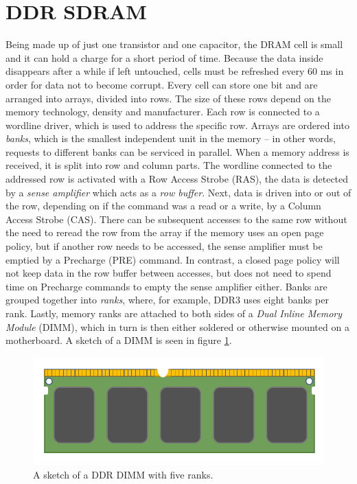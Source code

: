 \section{DDR SDRAM}
Being made up of just one transistor and one capacitor, the DRAM cell is small and it can hold a charge for a short period of time. Because the data inside disappears after a while if left untouched, cells must be refreshed every 60 ms in order for data not to become corrupt. Every cell can store one bit and are arranged into arrays, divided into rows. The size of these rows depend on the memory technology, density and manufacturer. Each row is connected to a wordline driver, which is used to address the specific row. Arrays are ordered into \emph{banks}, which is the smallest independent unit in the memory -- in other words, requests to different banks can be serviced in parallel. When a memory address is received, it is split into row and column parts. The wordline connected to the addressed row is activated with a Row Access Strobe (RAS), the data is detected by a \emph{sense amplifier} which acts as a \emph{row buffer}. Next, data is driven into or out of the row, depending on if the command was a read or a write, by a Column Access Strobe (CAS). There can be subsequent accesses to the same row without the need to reread the row from the array if the memory uses an open page policy, but if another row needs to be accessed, the sense amplifier must be emptied by a Precharge (PRE) command. In contrast, a closed page policy will not keep data in the row buffer between accesses, but does not need to spend time on Precharge commands to empty the sense amplifier either. Banks are grouped together into \emph{ranks}, where, for example, DDR3 uses eight banks per rank. Lastly, memory ranks are attached to both sides of a \emph{Dual Inline Memory Module} (DIMM), which in turn is then either soldered or otherwise mounted on a motherboard. A sketch of a DIMM is seen in figure \ref{DDR4-DIMM}.
\bigskip

\begin{figure}[!ht]
\centering
\includegraphics[width=0.6\linewidth]{figure/DDR4-DIMM.png}
\caption{A sketch of a DDR DIMM with five ranks.}
\label{DDR4-DIMM}
\end{figure}


